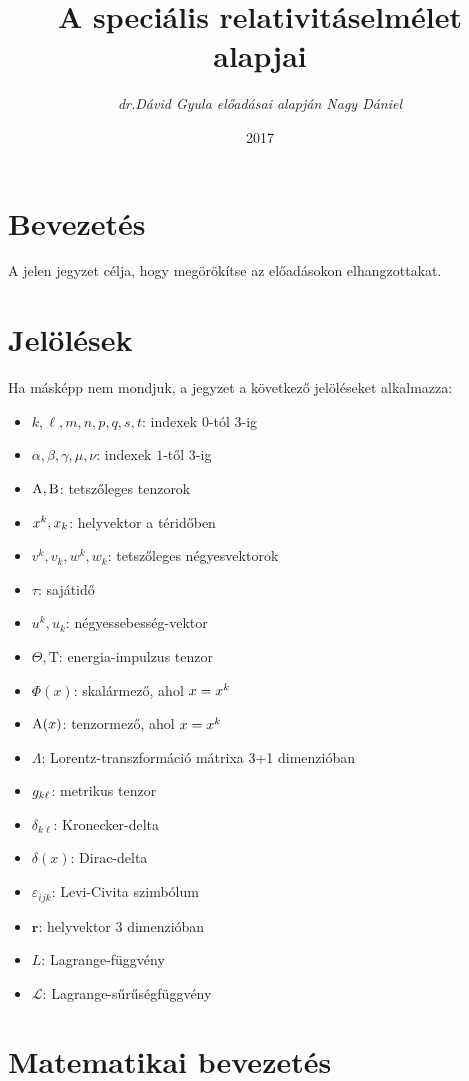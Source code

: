 \documentclass[a4paper,12pt]{article}
\title{\textbf{A speciális relativitáselmélet alapjai\\
\vspace{24pt}}}
\author{\textsl{dr.Dávid Gyula előadásai alapján Nagy Dániel}}
\date{2017}
\begin{document}
\maketitle
\pagebreak
\tableofcontents

\section{Bevezetés}
A jelen jegyzet célja, hogy megörökítse az előadásokon elhangzottakat.
\section{Jelölések}
Ha másképp nem mondjuk, a jegyzet a következő jelöléseket alkalmazza: \\
\begin{itemize}
\item $k, \ell, m, n, p, q, s, t$: indexek $0$-tól $3$-ig
\item $\alpha, \beta, \gamma, \mu, \nu$: indexek $1$-től $3$-ig
\item $\mathrm{A},\mathrm{B}$: tetszőleges tenzorok
\item $x^k, x_k$: helyvektor a téridőben
\item $v^k, v_k, w^k, w_k$: tetszőleges négyesvektorok
\item $\tau$: sajátidő
\item $u^k, u_k$: négyessebesség-vektor
\item $\Theta, \mathrm{T}$: energia-impulzus tenzor
\item $\Phi(x)$: skalármező, ahol $x=x^k$
\item $\mathrm{A}(x)$: tenzormező, ahol $x=x^k$
\item $\Lambda$: Lorentz-transzformáció mátrixa 3+1 dimenzióban
\item $g_{k\ell}$: metrikus tenzor
\item $\delta_{k\ell}$: Kronecker-delta
\item $\delta(x)$: Dirac-delta
\item $\varepsilon_{ijk}$: Levi-Civita szimbólum
\item $\mathbf{r}$: helyvektor 3 dimenzióban
\item $L$: Lagrange-függvény
\item $\mathcal{L}$: Lagrange-sűrűségfüggvény
\end{itemize}

\pagebreak

\section{Matematikai bevezetés}

\end{document}

